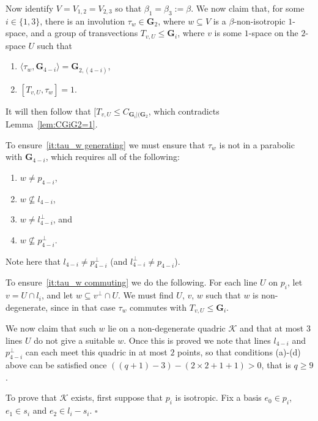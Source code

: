 \documentclass[12pt]{amsart}
\theoremstyle{definition}
\newcommand{\epf}{\qed}
\newcommand{\sbe}{\subseteq}
\newcommand{\cK}{{\mathcal K}}
\renewcommand{\qed}{\hfill $\square$}
\newcommand{\amgrpG}{{\mathbf{G}}}
\begin{document}
Now identify $V=V_{1,2}=V_{2,3}$ so that $\beta_1=\beta_3:=\beta$.
We now claim that, for some $i\in \{1,3\}$, there is an involution $\tau_w\in \amgrpG_2$, where $w\sbe V$ is a $\beta$-non-isotropic $1$-space, and a group of transvections $T_{v,U}\le \amgrpG_i$, where $v$ is some $1$-space on the $2$-space $U$ such that
\begin{enumerate}
\item\label{it:tau_w generating} $\langle \tau_w,\amgrpG_{4-i}\rangle=\amgrpG_{2,(4-i)}$,
\item\label{it:tau_w commuting} $[T_{v,U},\tau_w]=1$.
\end{enumerate}
It will then follow that $[T_{v,U}\le C_{\amgrpG_i|(\amgrpG_2}$, which contradicts Lemma~\ref{lem:CGiG2=1}.

To ensure~\eqref{it:tau_w generating} we must ensure that $\tau_w$ is not in a parabolic with 
 $\amgrpG_{4-i}$, which requires all of the following:
 \renewcommand{\theenumi}{\alph{enumi}}
 \begin{enumerate}
 \item $w\ne p_{4-i}$, 
 \item $w\not\sbe l_{4-i}$,
 \item $w\ne l_{4-i}^{\perp}$, and 
 \item $w\not\sbe p_{4-i}^{\perp}$.
 \end{enumerate}
Note here that $l_{4-i}\ne p_{4-i}^\perp$ (and $l_{4-i}^\perp\ne p_{4-i}$).

To ensure~\eqref{it:tau_w commuting} we do the following. For each line $U$ on $p_i$, let $v=U\cap l_i$, and let 
 $w\sbe v^\perp\cap U$.
We must find $U$, $v$, $w$ such that $w$ is non-degenerate, since in that case $\tau_w$ commutes with $T_{v,U}\le \amgrpG_i$.

We now claim that such $w$ lie on a non-degenerate quadric $\cK$ and that at most $3$  lines $U$ do not give a suitable $w$.
Once this is proved we note that lines $l_{4-i}$ and $p_{4-i}^\perp$ can each meet this quadric in at most $2$ points, so that conditions (a)-(d) above can be satisfied once $((q+1)-3)-(2\times 2+1+1)>0$, that is $q\ge 9$.

To prove that $\cK$ exists, first suppose that $p_i$ is isotropic.
Fix a basis $e_0\in p_i$, $e_1\in s_i$ and $e_2\in l_i-s_i$.
\epf
\end{document}
